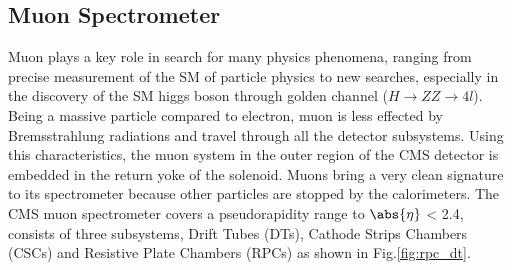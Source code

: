 \subsection{Muon Spectrometer}
Muon plays a key role in search for many physics phenomena, ranging from precise measurement of the SM of particle physics to new searches, especially in the discovery of the SM higgs boson through golden channel ($H\rightarrow ZZ \rightarrow 4l$). Being a massive particle compared to electron, muon is less effected by Bremsstrahlung radiations and travel through all the detector subsystems. Using this characteristics, the muon system in the outer region of the CMS detector is embedded in the return yoke of the solenoid. Muons bring a very clean signature to its spectrometer because other particles are stopped by the calorimeters. The CMS muon spectrometer covers a pseudorapidity range to $\abs{\eta}$ < 2.4, consists of three subsystems, Drift Tubes (DTs), Cathode Strips Chambers (CSCs) and Resistive Plate Chambers (RPCs) \cite{cms_muon} as shown in Fig.\ref{fig:rpc_dt}.   

